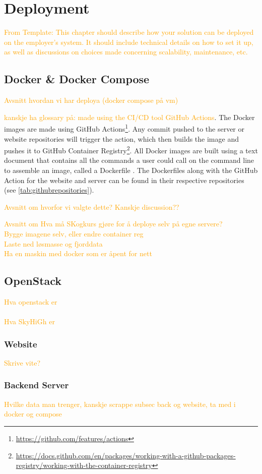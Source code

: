 \chapter{Deployment}\label{chap:deployment}

\textcolor{orange}{From Template: This chapter should describe how your solution can be deployed on the employer's system. It should include technical details on how to set it up, as well as discussions on choices made concerning scalability, maintenance, etc.}

\section{Docker \& Docker Compose}

\textcolor{orange}{Avsnitt hvordan vi har deploya (docker compose på vm)}

\textcolor{orange}{kanskje ha glossary på: made using the CI/CD tool GitHub Actions}.
The Docker images are made using GitHub Actions\footnote{\url{https://github.com/features/actions}}. Any commit pushed to the server or website repositories will trigger the action, which then builds the image and pushes it to GitHub Container Registry\footnote{\url{https://docs.github.com/en/packages/working-with-a-github-packages-registry/working-with-the-container-registry}}. All Docker images are built using a text document that contains all the commands a user could call on the command line to assemble an image, called a Dockerfile \cite{dockerfiledocs}. The Dockerfiles along with the GitHub Action for the website and server can be found in their respective repositories (see \autoref{tab:githubrepositories}).

\textcolor{orange}{Avsnitt om hvorfor vi valgte dette? Kanskje discussion??}

\textcolor{orange}{
Avsnitt om Hva må SKogkurs gjøre for å deploye selv på egne servere? \\
Bygge imagene selv, eller endre container reg \\
Laste ned løsmasse og fjorddata \\
Ha en maskin med docker som er åpent for nett
}


\section{OpenStack}\label{sec:deployment:openstack}

\textcolor{orange}{
Hva openstack er \\ \\
Hva SkyHiGh er
}

\subsection{Website}\label{subsec:deployment:docker:website}

\textcolor{orange}{Skrive vite?}

\subsection{Backend Server}\label{subsec:deployment:docker:backendserver}

\textcolor{orange}{Hvilke data man trenger, kanskje scrappe subsec back og website, ta med i docker og compose}
